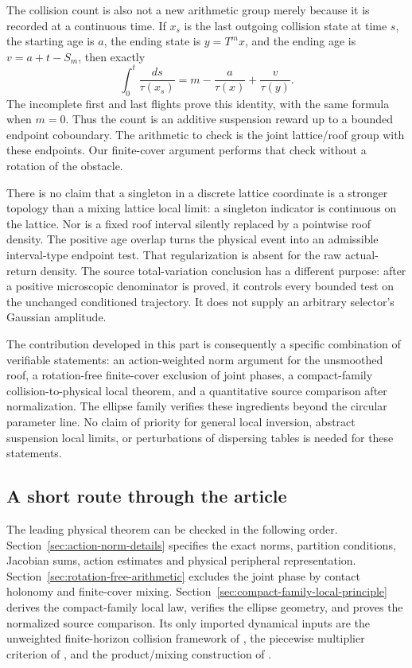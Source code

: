 The collision count is also not a new arithmetic group merely because
it is recorded at a continuous time. If $x_s$ is the last outgoing
collision state at time $s$, the starting age is $a$, the ending state
is $y=T^mx$, and the ending age is $v=a+t-S_m$, then exactly
\begin{equation}\label{eq:v35-count-as-suspension-reward}
 \int_0^t\frac{ds}{\tau(x_s)}
                     =m-\frac{a}{\tau(x)}+\frac{v}{\tau(y)}.
\end{equation}
The incomplete first and last flights prove this identity, with the
same formula when $m=0$. Thus the count is an additive suspension
reward up to a bounded endpoint coboundary. The arithmetic to check
is the joint lattice/roof group with these endpoints. Our finite-cover
argument performs that check without a rotation of the obstacle.

There is no claim that a singleton in a discrete lattice coordinate
is a stronger topology than a mixing lattice local limit: a singleton
indicator is continuous on the lattice. Nor is a fixed roof interval
silently replaced by a pointwise roof density. The positive age overlap
turns the physical event into an admissible interval-type endpoint
test. That regularization is absent for the raw actual-return density.
The source total-variation conclusion has a different purpose: after
a positive microscopic denominator is proved, it controls every
bounded test on the unchanged conditioned trajectory. It does not
supply an arbitrary selector's Gaussian amplitude.

The contribution developed in this part is consequently a specific
combination of verifiable statements: an action-weighted norm argument
for the unsmoothed roof, a rotation-free finite-cover exclusion of
joint phases, a compact-family collision-to-physical local theorem,
and a quantitative source comparison after normalization. The ellipse
family verifies these ingredients beyond the circular parameter line.
No claim of priority for general local inversion, abstract suspension
local limits, or perturbations of dispersing tables is needed for these
statements.

\subsection{A short route through the article}
The leading physical theorem can be checked in the following order.
Section~\ref{sec:action-norm-details} specifies the exact norms,
partition conditions, Jacobian sums, action estimates and physical
peripheral representation. Section~\ref{sec:rotation-free-arithmetic}
excludes the joint phase by contact holonomy and finite-cover mixing.
Section~\ref{sec:compact-family-local-principle} derives the compact-family
local law, verifies the ellipse geometry, and proves the normalized
source comparison. Its only imported dynamical inputs are the
unweighted finite-horizon collision framework of \cite{DZ11,DZ}, the
piecewise multiplier criterion of \cite{DPZ}, and the product/mixing
construction of \cite{Young}.

